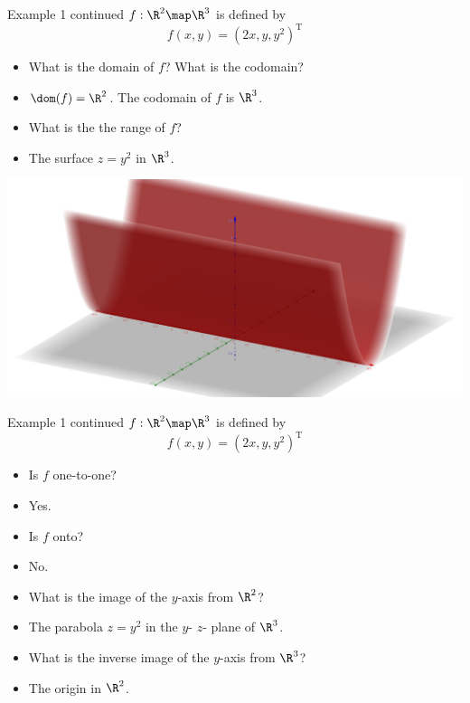 \documentclass{beamer}
\begin{document}
\begin{frame}{Example 1 continued}
$f:\R^2\map\R^3$ is defined by
$$f(x,y) = (2x, y, y^2)^{\text{T}}$$
\begin{itemize}
\item What is the domain of $f$? What is the codomain?
\item $\dom(f) =\R^2$. The codomain of $f$ is $\R^3$.
\item What is the the range of $f$?
\item The surface $z=y^2$ in $\R^3$.
\end{itemize}
\pause
\includegraphics[scale=0.1]{z-equals-y-squared}
\end{frame}


\begin{frame}{Example 1 continued}
$f:\R^2\map\R^3$ is defined by
$$f(x,y) = (2x, y, y^2)^{\text{T}}$$
\begin{itemize}
\item Is $f$ one-to-one?
\item Yes.
\item Is $f$ onto?
\item No.
\item What is the image of the $y$-axis from $\R^2$?
\item The parabola $z=y^2$ in the $y$- $z$- plane of $\R^3$.
\item What is the inverse image of the $y$-axis from $\R^3$?
\item The origin in $\R^2$.
\end{itemize}
\end{frame}

\end{document}
